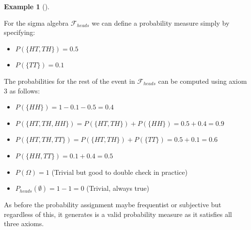 \documentclass[
  letterpaper,
  DIV=11,
  numbers=noendperiod]{scrreport}
\providecommand{\tightlist}{%
  \setlength{\itemsep}{0pt}\setlength{\parskip}{0pt}}
\theoremstyle{definition}
\newtheorem{example}{Example}[chapter]
\theoremstyle{plain}
\theoremstyle{definition}
\theoremstyle{plain}
\theoremstyle{remark}
\begin{document}
\begin{tcolorbox}[enhanced jigsaw, breakable, opacityback=0, leftrule=.75mm, colback=white, bottomtitle=1mm, coltitle=black, toptitle=1mm, titlerule=0mm, bottomrule=.15mm, colframe=quarto-callout-note-color-frame, title={Probability measure for the number of heads in two coin flips}, opacitybacktitle=0.6, colbacktitle=quarto-callout-note-color!10!white, rightrule=.15mm, arc=.35mm, toprule=.15mm, left=2mm]

\begin{example}[]\protect\hypertarget{exm-probability-measure-heads}{}\label{exm-probability-measure-heads}

For the sigma algebra \(\mathcal F_{heads}\) we can define a probability
measure simply by specifying:

\begin{itemize}
\tightlist
\item
  \(P(\{HT,TH\}) = 0.5\)
\item
  \(P(\{TT\}) = 0.1\)
\end{itemize}

The probabilities for the rest of the event in \(\mathcal F_{heads}\)
can be computed using axiom 3 as follows:

\begin{itemize}
\tightlist
\item
  \(P(\{HH\}) = 1-0.1-0.5 = 0.4\)
\item
  \(P(\{HT,TH,HH\}) = P(\{HT,TH\}) + P(\{HH\}) = 0.5 + 0.4 = 0.9\)
\item
  \(P(\{HT,TH,TT\}) = P(\{HT,TH\}) + P(\{TT\})= 0.5 + 0.1 =0.6\)
\item
  \(P(\{HH,TT\}) = 0.1 +0.4 = 0.5\)
\item
  \(P(\Omega) = 1\) (Trivial but good to double check in practice)
\item
  \(P_{heads}(\emptyset) = 1-1=0\) (Trivial, always true)
\end{itemize}

As before the probability assignment maybe frequentist or subjective but
regardless of this, it generates is a valid probability measure as it
satisfies all three axioms.

\end{example}

\end{tcolorbox}
\end{document}
